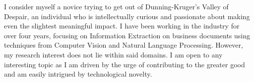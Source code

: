 I consider myself a novice trying to get out of Dunning-Kruger's Valley of Despair, an individual who is intellectually curious and passionate about making even the slightest meaningful impact. I have been working in the industry for over four years, focusing on Information Extraction on business documents using techniques from Computer Vision and Natural Language Processing. However, my research interest does not lie within said domains. I am open to any interesting topic as I am driven by the urge of contributing to the greater good and am easily intrigued by technological novelty.